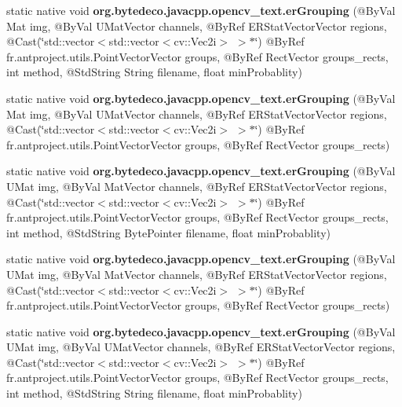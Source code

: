 \begin{DoxyCompactItemize}
\item 
\mbox{\label{group__text__detect_ga612a196636f1f850aa2b0ab6ba3e042f}} 
static native void {\bfseries org.\+bytedeco.\+javacpp.\+opencv\+\_\+text.\+er\+Grouping} (@By\+Val Mat img, @By\+Val U\+Mat\+Vector channels, @By\+Ref E\+R\+Stat\+Vector\+Vector regions, @Cast(\char`\"{}std\+::vector$<$std\+::vector$<$cv\+::\+Vec2i$>$ $>$$\ast$\char`\"{}) @By\+Ref fr.antproject.utils.Point\+Vector\+Vector groups, @By\+Ref Rect\+Vector groups\+\_\+rects, int method, @Std\+String String filename, float min\+Probablity)
\item 
\mbox{\label{group__text__detect_ga5a88d259858f8d9addad5d39344c0ed4}} 
static native void {\bfseries org.\+bytedeco.\+javacpp.\+opencv\+\_\+text.\+er\+Grouping} (@By\+Val Mat img, @By\+Val U\+Mat\+Vector channels, @By\+Ref E\+R\+Stat\+Vector\+Vector regions, @Cast(\char`\"{}std\+::vector$<$std\+::vector$<$cv\+::\+Vec2i$>$ $>$$\ast$\char`\"{}) @By\+Ref fr.antproject.utils.Point\+Vector\+Vector groups, @By\+Ref Rect\+Vector groups\+\_\+rects)
\item 
\mbox{\label{group__text__detect_ga06e9e2e730381e2b62700dcd5b9157fe}} 
static native void {\bfseries org.\+bytedeco.\+javacpp.\+opencv\+\_\+text.\+er\+Grouping} (@By\+Val U\+Mat img, @By\+Val Mat\+Vector channels, @By\+Ref E\+R\+Stat\+Vector\+Vector regions, @Cast(\char`\"{}std\+::vector$<$std\+::vector$<$cv\+::\+Vec2i$>$ $>$$\ast$\char`\"{}) @By\+Ref fr.antproject.utils.Point\+Vector\+Vector groups, @By\+Ref Rect\+Vector groups\+\_\+rects, int method, @Std\+String Byte\+Pointer filename, float min\+Probablity)
\item 
\mbox{\label{group__text__detect_ga373c44d54fdc93c2e50bdde71c156941}} 
static native void {\bfseries org.\+bytedeco.\+javacpp.\+opencv\+\_\+text.\+er\+Grouping} (@By\+Val U\+Mat img, @By\+Val Mat\+Vector channels, @By\+Ref E\+R\+Stat\+Vector\+Vector regions, @Cast(\char`\"{}std\+::vector$<$std\+::vector$<$cv\+::\+Vec2i$>$ $>$$\ast$\char`\"{}) @By\+Ref fr.antproject.utils.Point\+Vector\+Vector groups, @By\+Ref Rect\+Vector groups\+\_\+rects)
\item 
\mbox{\label{group__text__detect_ga3fe1fa2a3b9ca5cbcdbedfc4d45b36e1}} 
static native void {\bfseries org.\+bytedeco.\+javacpp.\+opencv\+\_\+text.\+er\+Grouping} (@By\+Val U\+Mat img, @By\+Val U\+Mat\+Vector channels, @By\+Ref E\+R\+Stat\+Vector\+Vector regions, @Cast(\char`\"{}std\+::vector$<$std\+::vector$<$cv\+::\+Vec2i$>$ $>$$\ast$\char`\"{}) @By\+Ref fr.antproject.utils.Point\+Vector\+Vector groups, @By\+Ref Rect\+Vector groups\+\_\+rects, int method, @Std\+String String filename, float min\+Probablity)
$$
\end{DoxyCompactItemize}
